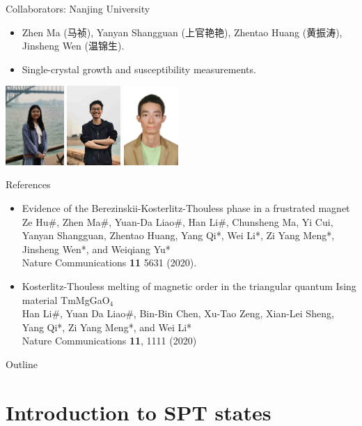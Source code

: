 \documentclass[xcolor=table, aspectratio=169,ignorenonframetext]{beamer}
\begin{document}
\begin{frame}{Collaborators: Nanjing University}
\begin{itemize}
	\item Zhen Ma (马祯), Yanyan Shangguan (上官艳艳), Zhentao Huang (黄振涛), Jinsheng Wen (温锦生).
	\item Single-crystal growth and susceptibility measurements.
\end{itemize}
	\begin{center}
		\includegraphics[height=3cm]{../people/yanyanshangguan}
		\includegraphics[height=3cm]{../people/zhentaohuang}
		\includegraphics[height=3cm]{../people/jinshengwen}
	\end{center}
\end{frame}

\begin{frame}{References}
\begin{itemize}
	\item Evidence of the Berezinskii-Kosterlitz-Thouless phase in a frustrated magnet\\
Ze Hu\#, Zhen Ma\#, Yuan-Da Liao\#, Han Li\#, Chunsheng Ma, Yi Cui, Yanyan Shangguan, Zhentao Huang, Yang Qi*, Wei Li*, Zi Yang Meng*, Jinsheng Wen*, and Weiqiang Yu*\\
Nature Communications \textbf{11} 5631 (2020).
	\item Kosterlitz-Thouless melting of magnetic order in the triangular quantum Ising material TmMgGaO${}_4$\\
Han Li\#, Yuan Da Liao\#, Bin-Bin Chen, Xu-Tao Zeng, Xian-Lei Sheng, Yang Qi*, Zi Yang Meng*, and Wei Li*\\
Nature Communications \textbf{11}, 1111 (2020)
\end{itemize}
\end{frame}

\begin{frame}{Outline}
		\tableofcontents
\end{frame}

\section{Introduction to SPT states}
\end{document}
